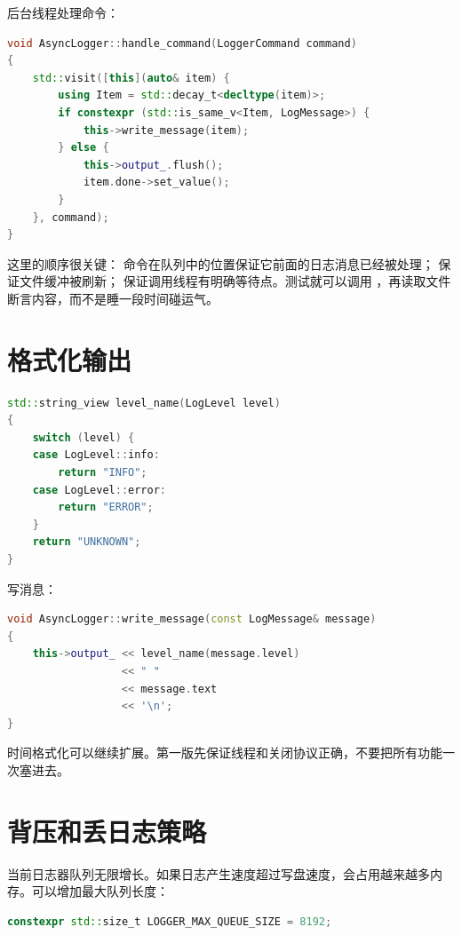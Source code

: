 后台线程处理命令：

\begin{lstlisting}[language=C++,caption={后台处理 flush 命令}]
void AsyncLogger::handle_command(LoggerCommand command)
{
    std::visit([this](auto& item) {
        using Item = std::decay_t<decltype(item)>;
        if constexpr (std::is_same_v<Item, LogMessage>) {
            this->write_message(item);
        } else {
            this->output_.flush();
            item.done->set_value();
        }
    }, command);
}
\end{lstlisting}

这里的顺序很关键： 命令在队列中的位置保证它前面的日志消息已经被处理； 保证文件缓冲被刷新； 保证调用线程有明确等待点。测试就可以调用 ，再读取文件断言内容，而不是睡一段时间碰运气。

\section{格式化输出}

\begin{lstlisting}[language=C++,caption={格式化日志级别}]
std::string_view level_name(LogLevel level)
{
    switch (level) {
    case LogLevel::info:
        return "INFO";
    case LogLevel::error:
        return "ERROR";
    }
    return "UNKNOWN";
}
\end{lstlisting}

写消息：

\begin{lstlisting}[language=C++,caption={写日志消息}]
void AsyncLogger::write_message(const LogMessage& message)
{
    this->output_ << level_name(message.level)
                  << " "
                  << message.text
                  << '\n';
}
\end{lstlisting}

时间格式化可以继续扩展。第一版先保证线程和关闭协议正确，不要把所有功能一次塞进去。

\section{背压和丢日志策略}

当前日志器队列无限增长。如果日志产生速度超过写盘速度，会占用越来越多内存。可以增加最大队列长度：

\begin{lstlisting}[language=C++,caption={日志队列背压策略}]
constexpr std::size_t LOGGER_MAX_QUEUE_SIZE = 8192;
\end{lstlisting}

